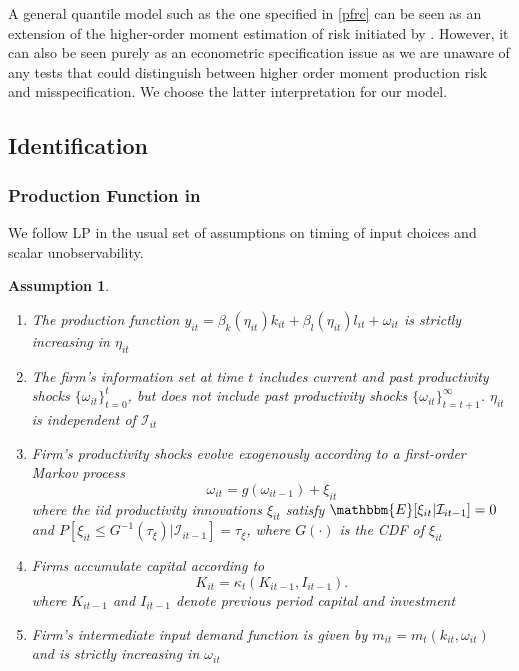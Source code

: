 \documentclass[11pt]{article}
\newtheorem{assump}{Assumption}[section]
\begin{document}
A general quantile model such as the one specified in \eqref{pfrc} can be seen as an extension of the higher-order moment estimation of risk initiated by \cite{Antle1983}. However, it can also be seen purely as an econometric specification issue as we are unaware of any tests that could distinguish between higher order moment production risk and misspecification. We choose the latter interpretation for our model. 

\subsection{Identification}
\subsubsection{Production Function in \cite{Levinsohn2003}}
We follow LP in the usual set of assumptions on timing of input choices and scalar unobservability.

\begin{assump} \label{qpfassume}
~
\begin{enumerate}[label=(\alph*)]
	\item The production function $y_{it}=\beta_{k}(\eta_{it})k_{it}+\beta_{l}(\eta_{it})l_{it}+\omega_{it}$ is strictly increasing in $\eta_{it}$
	\item The firm's information set at time $t$ includes current and past productivity shocks $\{\omega_{it}\}_{t=0}^{t}$, but does not include past productivity shocks $\{\omega_{it}\}_{t=t+1}^{\infty}$. $\eta_{it}$ is independent of $\mathcal{I}_{it}$
	\item Firm's productivity shocks evolve exogenously according to a first-order Markov process
	\begin{equation}
	\omega_{it}=g(\omega_{it-1})+\xi_{it}
	\end{equation}
	where the iid productivity innovations $\xi_{it}$ satisfy $\mathbbm{E}[\xi_{it}|\mathcal{I}_{it-1}]=0$ and $P[\xi_{it}\leq G^{-1}(\tau_{\xi})|\mathcal{I}_{it-1}]=\tau_{\xi}$, where $G(\cdot)$ is the CDF of $\xi_{it}$
	\item Firms accumulate capital according to
	\begin{equation}
	    K_{it}=\kappa_{t}(K_{it-1}, I_{it-1}).
	\end{equation}
	where $K_{it-1}$ and $I_{it-1}$ denote previous period capital and investment
	\item Firm's intermediate input demand function is given by $m_{it}=m_{t}(k_{it}, \omega_{it})$ and is strictly increasing in $\omega_{it}$
\end{enumerate}
\end{assump}
\end{document}
